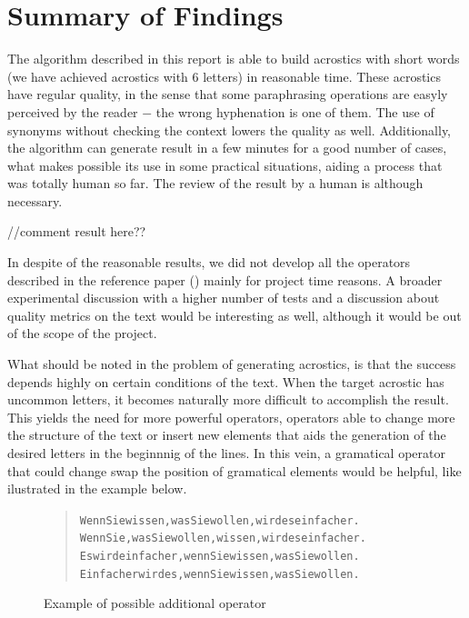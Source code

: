 \documentclass{reportAlternative}
\begin{document}
\chapter{Summary of Findings}
The algorithm described in this report is able to build acrostics with short words (we have achieved acrostics with 6 letters) in reasonable time. These acrostics have regular quality, in the sense that some paraphrasing operations are easyly perceived by the reader $-$ the wrong hyphenation is one of them. The use of synonyms without checking the context lowers the quality as well. Additionally, the algorithm can generate result in a few minutes for a good number of cases, what makes possible its use in some practical situations, aiding a process that was totally human so far. The review of the result by a human is although necessary. \par

//comment result here??\par

In despite of the reasonable results, we did not develop all the operators described in the reference paper (\cite{Stein}) mainly for project time reasons. A broader experimental discussion with a higher number of tests and a discussion about quality metrics on the text would be interesting as well, although it would be out of the scope of the project. \par

What should be noted in the problem of generating acrostics, is that the success depends highly on certain conditions of the text. When the target acrostic has uncommon letters, it becomes naturally more difficult to accomplish the result. This yields the need for more powerful operators, operators able to change more the structure of the text or insert new elements that aids the generation of the desired letters in the beginnnig of the lines. In this vein, a gramatical operator that could change swap the position of gramatical elements would be helpful, like ilustrated in the example below. \par

\begin{figure}[H]
\begin{quote}
\begin{alltt}
Wenn Sie wissen, was Sie wollen, wird es einfacher.
Wenn Sie, was Sie wollen, wissen, wird es einfacher.
Es wird einfacher, wenn Sie wissen, was Sie wollen.
Einfacher wird es, wenn Sie wissen, was Sie wollen.
\end{alltt}
\end{quote}
\caption{Example of possible additional operator}
\end{figure}
\end{document}
